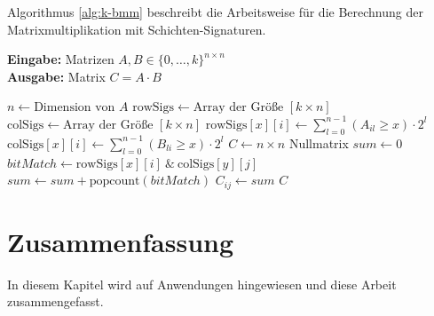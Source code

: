 ﻿\documentclass[a4paper,12pt]{article}
\theoremstyle{definition}
\begin{document}
Algorithmus \ref*{alg:k-bmm} beschreibt die Arbeitsweise für die Berechnung der Matrixmultiplikation mit Schichten-Signaturen.
\begin{algorithm}[H]
	\caption{Beschränkte Matrixmultiplikation mit Schichten-Signaturen}
	\label{alg:k-bmm}
	\textbf{Eingabe:} Matrizen $A, B \in \{0,\dots,k\}^{n \times n}$ \\
	\textbf{Ausgabe:} Matrix $C = A \cdot B$
	\begin{algorithmic}[1]
		\State $n \gets \text{Dimension von } A$
		\State $\text{rowSigs} \gets \text{Array der Größe } [k \times n]$
		\State $\text{colSigs} \gets \text{Array der Größe } [k \times n]$
		\State $\text{rowSigs}[x][i] \gets \sum_{l=0}^{n-1} (A_{il} \geq x) \cdot 2^l$ 
		\State $\text{colSigs}[x][i] \gets \sum_{l=0}^{n-1} (B_{li} \geq x) \cdot 2^l$ 
		\EndFor
		\EndFor
		\State $C \gets n \times n$ Nullmatrix
		\State $sum \gets 0$
		\State $bitMatch \gets \text{rowSigs}[x][i] \ \& \ \text{colSigs}[y][j]$
		\State $sum \gets sum + \text{popcount}(bitMatch)$ 
		\EndFor
		\EndFor
		\State $C_{ij} \gets sum$
		\EndFor
		\EndFor    
		\State \Return $C$
	\end{algorithmic}
\end{algorithm}

\section{Zusammenfassung}
In diesem Kapitel wird auf Anwendungen hingewiesen und diese Arbeit zusammengefasst.
\end{document}
